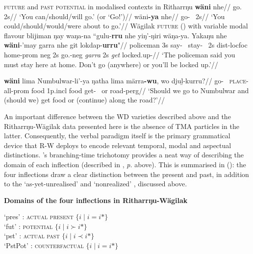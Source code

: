 \pex \textsc{future} and \textsc{past potential} in modalised contexts in Ritharrŋu
\a\begingl\gla \textbf{wäni} nhe//
\glb go.\II~ 2s//
\glft `You can/should/will go.' (or `Go!')//\endgl
\a\begingl\gla wäni\textbf{-ya} nhe//
\glb go-\V~ 2s//
\glft`You could/should/would/were about to go.'//\endgl
\xe
\pex Wägilak \textsc{future} (\II) with variable modal flavour
\a \begingl\gla blijiman ŋay waŋa-na ``gulu-\textbf{rru} nhe yiŋ'-ŋiri wäŋa-ya. Yakaŋu nhe \textbf{wäni}-'may garra nhe git lokdap-\textbf{urru}"//
\glb policeman 3s say-\III~ stay-\II~ 2s \gls{dist}-\gls{loc}\textdblhyphen\gls{foc} home-\gls{prom} \gls{neg} 2s go.\II-\gls{neg} \textit{garra} 2s \textit{get} locked.up-\II//
\glft`The policeman said you must stay here at home. Don't go (anywhere) or you'll be locked up.'\trailingcitation{[RŊ~20190520~18']}//
\endgl

\a\begingl\gla \textbf{wäni} lima Numbulwar-li'-ya ŋatha lima märra\textbf{-wu}, wo djuḻ-kurru?//
\glb go-\II~ \textsc{place}-\gls{all}-\gls{prom} food 1p.\gls{incl} food get-\II~ or road-\gls{perg}//
\glft`Should we go to Numbulwar and (should we) get food or (continue) along the road?'\trailingcitation{[PW~20190520~25']}//\endgl

\xe

An important difference between the WD varieties described above and the Ritharrŋu-Wägilak data presented here is the absence of TMA particles in the latter. Consequently, the verbal paradigm itself is the primary grammatical device that R-W deploys to encode relevant temporal, modal and aspectual distinctions. 's branching-time trichotomy provides a neat way of describing the domain of each inflection (described in , \textit{p.} above). This is summarised in (\nextx): the four inflections draw a clear distinction between the present and past, in addition to the `as-yet-unrealised' and `nonrealized' \citep[cf.][]{Cristofaro2012}, discussed above.

\pex \textbf{Domains of the four inflections in Ritharrŋu-Wägilak}


\denote[i*]{\I} `\gls{pres}' : \textsc{actual present} $ \{i\mid i = i*\} $\\
\denote[i*]{\II} `\gls{fut}' : \textsc{potential} $ \{i\mid i \succ i*\} $\\
\denote[i*]{\III} `\gls{pst}' : \textsc{actual past} $ \{i\mid i \prec i*\} $\\
\denote[i*]{\V} `\gls{PstPot}' : \textsc{counterfactual} $ \{i\mid i = i*\} $
\xe

